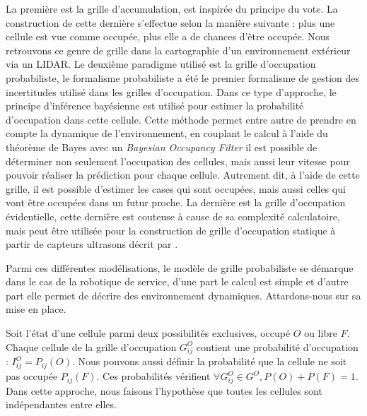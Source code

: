 La première est la grille d'accumulation, est inspirée du principe du vote. La construction de cette dernière s'effectue selon la manière suivante : plus une cellule est vue comme occupée, plus elle a de chances d'être occupée. Nous retrouvons ce genre de grille dans la cartographie d'un environnement extérieur via un LIDAR. Le deuxième paradigme utilisé est la grille d'occupation probabiliste, le formalisme probabiliste a été le premier formalisme de gestion des incertitudes utilisé dans les grilles d'occupation. Dans ce type d'approche, le principe d'inférence bayésienne est utilisé pour estimer la probabilité d'occupation dans cette cellule. Cette méthode permet entre autre de prendre en compte la dynamique de l'environnement, en couplant le calcul à l'aide du théorème de Bayes avec un \textit{Bayesian Occupancy Filter} il est possible de déterminer non seulement l'occupation des cellules, mais aussi leur vitesse pour pouvoir réaliser la prédiction pour chaque cellule. Autrement dit, à l'aide de cette grille, il est possible d'estimer les cases qui sont occupées, mais aussi celles qui vont être occupées dans un futur proche. La dernière est la grille d'occupation évidentielle, cette dernière est couteuse à cause de sa complexité calculatoire, mais peut être utilisée pour la construction de grille d'occupation statique à partir de capteurs ultrasons décrit par \cite{pagac_evidential_1998}.

Parmi ces différentes modélisations, le modèle de grille probabiliste se démarque dans le cas de la robotique de service, d'une part le calcul est simple et d'autre part elle permet de décrire des environnement dynamiques. Attardons-nous sur sa mise en place.

Soit l'état d'une cellule parmi deux possibilités exclusives, occupé $O$ ou libre $F$. Chaque cellule de la grille d'occupation $G_{ij}^O$ contient une probabilité d'occupation : $I_{ij}^O = P_{ij}(O)$. Nous pouvons aussi définir la probabilité que la cellule ne soit pas occupée $P_{ij}(F)$. Ces probabilités vérifient $\forall G_{ij}^O \in G^O, P(O) + P(F) = 1$. Dans cette approche, nous faisons l'hypothèse que toutes les cellules sont indépendantes entre elles.

